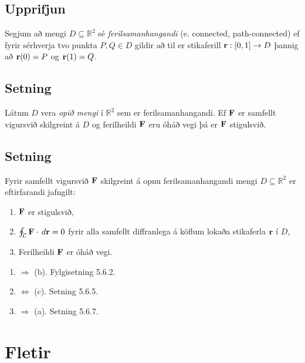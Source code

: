 \documentclass[a4paper,10pt,icelandic]{sphinxmanual}
\begin{document}
\subsection{Upprifjun}
\label{Kafli5:upprifjun}
Segjum að mengi \(D\subseteq {\mathbb  R}^2\) sé
\emph{ferilsamanhangandi} (e. connected, path-connected) ef fyrir sérhverja
tvo punkta \(P, Q\in D\) gildir að til er stikaferill
\(\mbox{${\bf r}$}:[0,1]\rightarrow D\) þannig að
\(\mbox{${\bf r}$}(0)=P\) og \(\mbox{${\bf r}$}(1)=Q\).


\subsection{Setning}
\label{Kafli5:id14}
Látum \(D\) vera \textit{opið mengi} í \({\mathbb  R}^2\) sem er
ferilsamanhangandi. Ef \(\mbox{${\bf F}$}\) er samfellt vigursvið
skilgreint á \(D\) og ferilheildi \(\mbox{${\bf F}$}\) eru óháð
vegi þá er \(\mbox{${\bf F}$}\) stigulsvið.


\subsection{Setning}
\label{Kafli5:id15}
Fyrir samfellt vigursvið \(\mbox{${\bf F}$}\) skilgreint á opnu
ferilsamanhangandi mengi \(D\subseteq {\mathbb  R}^2\) er
eftirfarandi jafngilt:
\begin{enumerate}
\item {} 
\(\mbox{${\bf F}$}\) er stigulsvið,

\item {} 
\(\oint_{\cal C} \mbox{${\bf F}$}\cdot\,d\mbox{${\bf r}$}=0\) fyrir alla samfellt diffranlega á köflum lokaða stikaferla \(\mbox{${\bf r}$}\) í \(D\),

\item {} 
Ferilheildi \(\mbox{${\bf F}$}\) er óháð vegi.

\end{enumerate}
\begin{enumerate}
\item {} 
\(\Rightarrow\) (b). Fylgisetning 5.6.2.

\item {} 
\(\Leftrightarrow\) (c). Setning 5.6.5.

\item {} 
\(\Rightarrow\) (a). Setning 5.6.7.

\end{enumerate}


\section{Fletir}
\label{Kafli5:index-4}\label{Kafli5:fletir}
\end{document}
